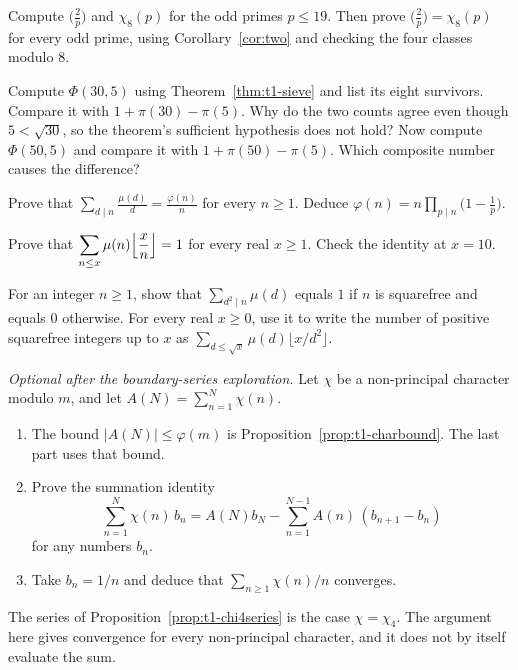 \begin{exercise}[$\star$]\label{ex:t1-chi8check}
Compute $\bigl(\frac2p\bigr)$ and $\chi_8(p)$ for the odd primes $p\le19$. Then prove $\bigl(\frac2p\bigr)=\chi_8(p)$ for every odd prime, using Corollary~\ref{cor:two} and checking the four classes modulo $8$.
\end{exercise}

\begin{exercise}[$\star\star$]\label{ex:t1-sieve30}
Compute $\Phi(30,5)$ using Theorem~\ref{thm:t1-sieve} and list its eight survivors. Compare it with $1+\pi(30)-\pi(5)$. Why do the two counts agree even though $5<\sqrt{30}$, so the theorem's sufficient hypothesis does not hold? Now compute $\Phi(50,5)$ and compare it with $1+\pi(50)-\pi(5)$. Which composite number causes the difference?
\end{exercise}

\begin{exercise}[$\star\star$]\label{ex:t1-phi-ratio}
Prove that $\displaystyle\sum_{d\mid n}\frac{\mu(d)}d=\frac{\varphi(n)}n$ for every $n\ge1$. Deduce $\varphi(n)=n\prod_{p\mid n}\bigl(1-\frac1p\bigr)$.
\end{exercise}

\begin{exercise}[$\star\star$]\label{ex:t1-mu-floor}
Prove that $\displaystyle\sum_{n\le x}\mu(n)\Bigl\lfloor\frac xn\Bigr\rfloor=1$ for every real $x\ge1$. Check the identity at $x=10$.
\end{exercise}

\begin{exercise}[$\star\star$]\label{ex:t1-squarefree}
For an integer $n\ge1$, show that $\sum_{d^2\mid n}\mu(d)$ equals $1$ if $n$ is squarefree and equals $0$ otherwise. For every real $x\ge0$, use it to write the number of positive squarefree integers up to $x$ as $\sum_{d\le\sqrt x}\mu(d)\bigl\lfloor x/d^2\bigr\rfloor$.
\end{exercise}

\begin{exercise}[$\star\star\star$]\label{ex:t1-char-series}
\emph{Optional after the boundary-series exploration.}
Let $\chi$ be a non-principal character modulo $m$, and let $A(N)=\sum_{n=1}^N\chi(n)$.
\begin{enumerate}[label=(\alph*)]
\item The bound $|A(N)|\le\varphi(m)$ is Proposition~\ref{prop:t1-charbound}. The last part uses that bound.
\item Prove the summation identity
\[
\sum_{n=1}^N\chi(n)\,b_n=A(N)b_N-\sum_{n=1}^{N-1}A(n)\,(b_{n+1}-b_n)
\]
for any numbers $b_n$.
\item Take $b_n=1/n$ and deduce that $\sum_{n\ge1}\chi(n)/n$ converges.
\end{enumerate}
The series of Proposition~\ref{prop:t1-chi4series} is the case $\chi=\chi_4$. The argument here gives convergence for every non-principal character, and it does not by itself evaluate the sum.
\end{exercise}

